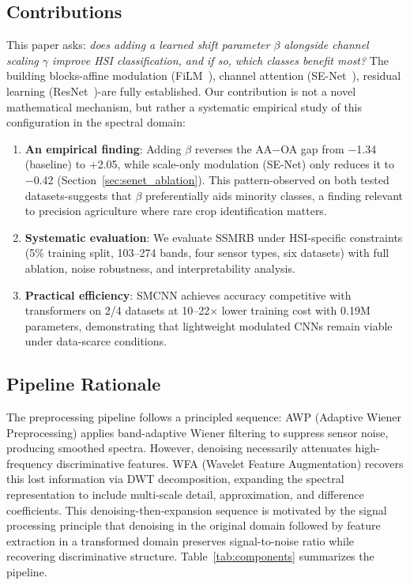\documentclass[conference]{IEEEtran}
\begin{document}
\subsection{Contributions}

This paper asks: \textit{does adding a learned shift parameter $\beta$ alongside channel scaling $\gamma$ improve HSI classification, and if so, which classes benefit most?} The building blocks-affine modulation (FiLM~\cite{perez2018film}), channel attention (SE-Net~\cite{hu2018squeeze}), residual learning (ResNet~\cite{he2016deep})-are fully established. Our contribution is not a novel mathematical mechanism, but rather a systematic empirical study of this configuration in the spectral domain:

\begin{enumerate}
\item \textbf{An empirical finding}: Adding $\beta$ reverses the AA$-$OA gap from $-$1.34 (baseline) to +2.05, while scale-only modulation (SE-Net) only reduces it to $-$0.42 (Section~\ref{sec:senet_ablation}). This pattern-observed on both tested datasets-suggests that $\beta$ preferentially aids minority classes, a finding relevant to precision agriculture where rare crop identification matters.
\item \textbf{Systematic evaluation}: We evaluate SSMRB under HSI-specific constraints (5\% training split, 103--274 bands, four sensor types, six datasets) with full ablation, noise robustness, and interpretability analysis.
\item \textbf{Practical efficiency}: SMCNN achieves accuracy competitive with transformers on 2/4 datasets at 10--22$\times$ lower training cost with 0.19M parameters, demonstrating that lightweight modulated CNNs remain viable under data-scarce conditions.
\end{enumerate}

\subsection{Pipeline Rationale}

The preprocessing pipeline follows a principled sequence: AWP (Adaptive Wiener Preprocessing) applies band-adaptive Wiener filtering to suppress sensor noise, producing smoothed spectra. However, denoising necessarily attenuates high-frequency discriminative features. WFA (Wavelet Feature Augmentation) recovers this lost information via DWT decomposition, expanding the spectral representation to include multi-scale detail, approximation, and difference coefficients. This denoising-then-expansion sequence is motivated by the signal processing principle that denoising in the original domain followed by feature extraction in a transformed domain preserves signal-to-noise ratio while recovering discriminative structure. Table~\ref{tab:components} summarizes the pipeline.
\end{document}
